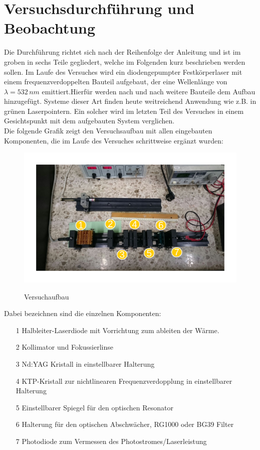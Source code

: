 \documentclass[twoside,colorback,accentcolor=tud4c,11pt]{tudreport}
\begin{document}
\chapter{Versuchsdurchführung und Beobachtung}
Die Durchführung richtet sich nach der Reihenfolge der Anleitung und ist im groben in sechs Teile gegliedert, welche im Folgenden kurz beschrieben werden sollen. Im Laufe des Versuches wird ein diodengepumpter Festkörperlaser mit einem frequenzverdoppelten Bauteil aufgebaut, der eine Wellenlänge von $\lambda =532\,\si{nm}$ emittiert.Hierfür werden nach und nach weitere Bauteile dem Aufbau hinzugefügt. Systeme dieser Art finden heute weitreichend Anwendung wie z.B. in grünen Laserpointern. Ein solcher wird im letzten Teil des Versuches in einem Gesichtspunkt mit dem aufgebauten System verglichen.\\
Die folgende Grafik zeigt den Versuchsaufbau mit allen eingebauten Komponenten, die im Laufe des Versuches schrittweise ergänzt wurden:
\begin{figure}[H]
\centering
   	\begin{minipage}[b]{0.9\textwidth}
   	\includegraphics[width=\textwidth]{graphics/aufbau.pdf}
  	\label{vauf}
   	\end{minipage}
\caption{Versuchaufbau}	
\end{figure}
Dabei bezeichnen sind die einzelnen Komponenten:
\begin{itemize}
\item[1] Halbleiter-Laserdiode mit Vorrichtung zum ableiten der Wärme.
\item[2] Kollimator und Fokussierlinse
\item[3] Nd:YAG Kristall in einstellbarer Halterung
\item[4] KTP-Kristall zur nichtlinearen Frequenzverdopplung in einstellbarer Halterung
\item[5] Einstellbarer Spiegel für den optischen Resonator
\item[6] Halterung für den optischen Abschwächer, RG1000 oder BG39 Filter
\item[7] Photodiode zum Vermessen des Photostromes/Laserleistung
\end{itemize}
\end{document}

